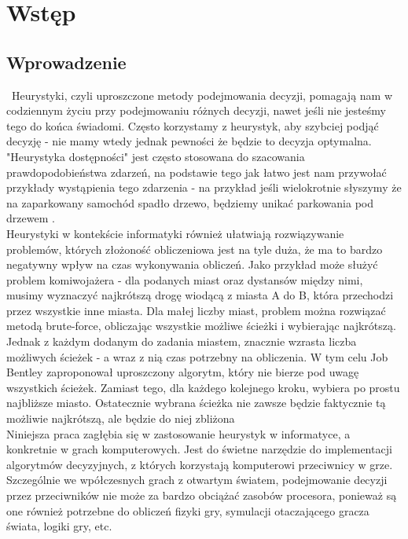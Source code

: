 \newpage %
\section{Wstęp}

\subsection{Wprowadzenie}
\indent\ Heurystyki, czyli uproszczone metody podejmowania decyzji, pomagają nam w codziennym życiu przy  podejmowaniu różnych decyzji, nawet jeśli nie jesteśmy tego do końca świadomi. Często korzystamy z heurystyk, aby szybciej podjąć decyzję - nie mamy wtedy jednak pewności że będzie to decyzja optymalna. "Heurystyka dostępności" jest często stosowana do szacowania prawdopodobieństwa zdarzeń, na podstawie tego jak łatwo jest nam przywołać przykłady wystąpienia tego zdarzenia - na przykład jeśli wielokrotnie słyszymy że na zaparkowany samochód spadło drzewo, będziemy unikać parkowania pod drzewem \cite{tversky74}.
\\ \indent Heurystyki w kontekście informatyki również ułatwiają rozwiązywanie problemów, których złożoność obliczeniowa jest na tyle duża, że ma to bardzo negatywny wpływ na czas wykonywania obliczeń. Jako przykład może służyć problem komiwojażera - dla podanych miast oraz dystansów między nimi, musimy wyznaczyć najkrótszą drogę wiodącą z miasta A do B, która przechodzi przez wszystkie inne miasta. Dla małej liczby miast, problem można rozwiązać metodą brute-force, obliczając wszystkie możliwe ścieżki i wybierając najkrótszą. Jednak z każdym dodanym do zadania miastem, znacznie wzrasta liczba możliwych ścieżek - a wraz z nią czas potrzebny na obliczenia. W tym celu Job Bentley zaproponował uproszczony algorytm, który nie bierze pod uwagę wszystkich ścieżek. Zamiast tego, dla każdego kolejnego kroku, wybiera po prostu najbliższe miasto. Ostatecznie wybrana ścieżka nie zawsze będzie faktycznie tą możliwie najkrótszą, ale będzie do niej zbliżona \cite{Hjeij2023}
\\ \indent Niniejsza praca zagłębia się w zastosowanie heurystyk w informatyce, a konkretnie w grach komputerowych. Jest do świetne narzędzie do implementacji algorytmów decyzyjnych, z których korzystają komputerowi przeciwnicy w grze. Szczególnie we wpółczesnych grach z otwartym światem, podejmowanie decyzji przez przeciwników nie może za bardzo obciążać zasobów procesora, ponieważ są one również potrzebne do obliczeń fizyki gry, symulacji otaczającego gracza świata, logiki gry, etc.
\\ \indent 

